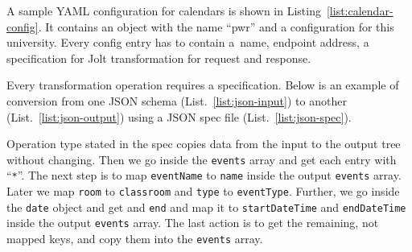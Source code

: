 

A sample YAML configuration for calendars is shown in Listing~\ref{list:calendar-config}. It contains an object with the name ``pwr'' and a configuration for this university. Every config entry has to contain a~name, endpoint address, a specification for Jolt transformation for request and response.



Every transformation operation requires a specification. Below is an example of conversion from one JSON schema (List.~\ref{list:json-input}) to another (List.~\ref{list:json-output}) using a JSON spec file (List.~\ref{list:json-spec}).





Operation type stated in the spec copies data from the input to the output tree without changing. Then we go inside the \texttt{events} array and get each entry with ``\texttt{*}''. The next step is to map \texttt{eventName} to \texttt{name} inside the output \texttt{events} array. Later we map \texttt{room} to \texttt{classroom} and \texttt{type} to \texttt{eventType}. Further, we go inside the \texttt{date} object and get \texttt{} and \texttt{end} and map it to \texttt{startDateTime} and \texttt{endDateTime} inside the output \texttt{events} array. The last action is to get the remaining, not mapped keys, and copy them into the \texttt{events} array.




